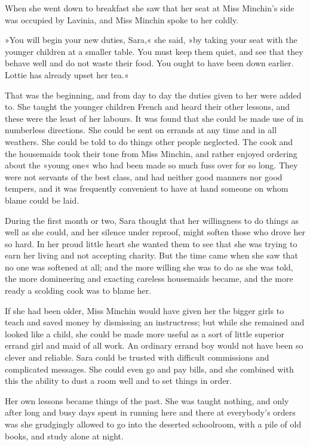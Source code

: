 When she went down to breakfast she saw that her seat at Miss Minchin's side was occupied by Lavinia, and Miss Minchin spoke to her coldly.

»You will begin your new duties, Sara,« she said, »by taking your seat with the younger children at a smaller table. You must keep them quiet, and see that they behave well and do not waste their food. You ought to have been down earlier. Lottie has already upset her tea.«

That was the beginning, and from day to day the duties given to her were added to. She taught the younger children French and heard their other lessons, and these were the least of her labours. It was found that she could be made use of in numberless directions. She could be sent on errands at any time and in all weathers. She could be told to do things other people neglected. The cook and the housemaids took their tone from Miss Minchin, and rather enjoyed ordering about the »young one« who had been made so much fuss over for so long. They were not servants of the best class, and had neither good manners nor good tempers, and it was frequently convenient to have at hand someone on whom blame could be laid.

During the first month or two, Sara thought that her willingness to do things as well as she could, and her silence under reproof, might soften those who drove her so hard. In her proud little heart she wanted them to see that she was trying to earn her living and not accepting charity. But the time came when she saw that no one was softened at all; and the more willing she was to do as she was told, the more domineering and exacting careless housemaids became, and the more ready a scolding cook was to blame her.

If she had been older, Miss Minchin would have given her the bigger girls to teach and saved money by dismissing an instructress; but while she remained and looked like a child, she could be made more useful as a sort of little superior errand girl and maid of all work. An ordinary errand boy would not have been so clever and reliable. Sara could be trusted with difficult commissions and complicated messages. She could even go and pay bills, and she combined with this the ability to dust a room well and to set things in order.

Her own lessons became things of the past. She was taught nothing, and only after long and busy days spent in running here and there at everybody's orders was she grudgingly allowed to go into the deserted schoolroom, with a pile of old books, and study alone at night.

